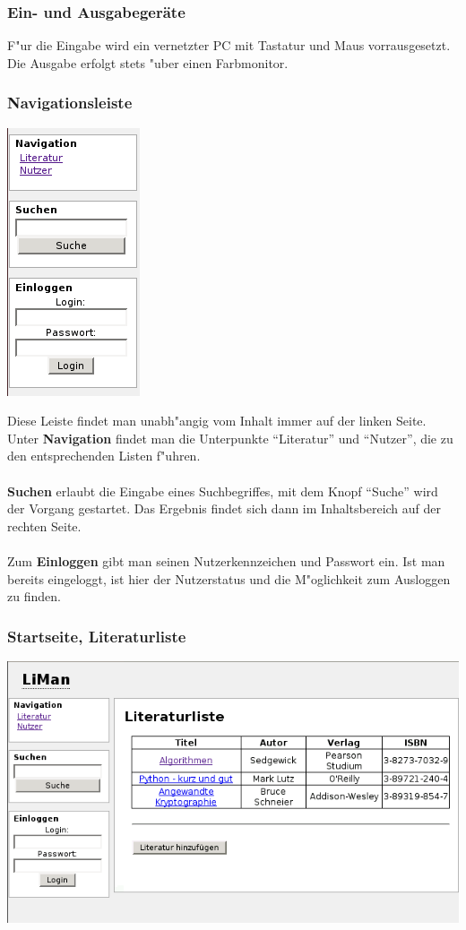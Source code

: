 \subsubsection{Ein- und Ausgabegeräte}
F"ur die Eingabe wird ein vernetzter PC mit Tastatur und Maus vorrausgesetzt.\\
Die Ausgabe erfolgt stets "uber einen Farbmonitor.
\newpage
\subsubsection{Navigationsleiste}
\begin{floatingfigure}[r]{0.4\textwidth}
\centering
\includegraphics[scale=0.6]{navigation.png} 
\end{floatingfigure}

Diese Leiste findet man unabh"angig vom Inhalt immer auf der linken Seite.
Unter {\bf Navigation} findet man die Unterpunkte ``Literatur'' und ``Nutzer'', die zu den entsprechenden Listen f"uhren.\\
\\
{\bf Suchen} erlaubt die Eingabe eines Suchbegriffes, mit dem Knopf ``Suche'' wird der Vorgang gestartet. 
Das Ergebnis findet sich dann im Inhaltsbereich auf der rechten Seite.\\
\\
Zum {\bf Einloggen} gibt man seinen Nutzerkennzeichen und Passwort ein. Ist man bereits eingeloggt, ist hier der Nutzerstatus
und die M"oglichkeit zum Ausloggen zu finden.
\subsubsection{Startseite, Literaturliste}
\includegraphics[scale=0.6]{index.png}

